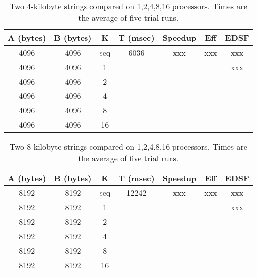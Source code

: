 \begin{table}[h]
	\begin{center}
		\begin{tabular}{ | c | c | c | c | c | c | c |}
			\hline 
			A (bytes)&	B (bytes) &	K	&	T (msec)	&	Speedup	&	Eff	&	EDSF \\
			\hline		
			4096    &	4096    &	seq	&	6036  		&	xxx		&	xxx	&	xxx \\
			4096   	&	4096   	&	1	&	 	 		&			&		&	xxx \\
			4096   	&	4096   	&	2	&	 	 	 	&			&		&\\
			4096   	&	4096   	&	4	&	 	 	 	&			&		&\\
			4096   	&	4096   	&	8	&	 	 	 	&			&		&\\
			4096   	&	4096   	&	16	&	 	 	 	&			&		&\\
			\hline
		\end{tabular}
	\end{center}
	\caption{Two 4-kilobyte strings compared on {1,2,4,8,16} processors. Times are the average of five trial runs.}
\end{table}



\begin{table}[h]
	\begin{center}
		\begin{tabular}{ | c | c | c | c | c | c | c |}
			\hline 
			A (bytes)&	B (bytes) &	K	&	T (msec)	&	Speedup	&	Eff	&	EDSF \\
			\hline		
			8192    &	8192    &	seq	&	12242  		&	xxx		&	xxx	&	xxx \\
			8192   	&	8192   	&	1	&	 	 		&			&		&	xxx \\
			8192   	&	8192   	&	2	&	 	 	 	&			&		&\\
			8192   	&	8192   	&	4	&	 	 	 	&			&		&\\
			8192   	&	8192   	&	8	&	 	 	 	&			&		&\\
			8192   	&	8192   	&	16	&	 	 	 	&			&		&\\
			\hline
		\end{tabular}
	\end{center}
	\caption{Two 8-kilobyte strings compared on {1,2,4,8,16} processors. Times are the average of five trial runs.}
\end{table}



